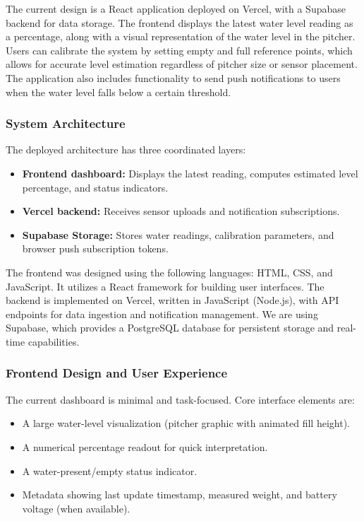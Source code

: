 The current design is a React application deployed on Vercel, with a Supabase backend for data storage. The frontend displays the latest water level reading as a percentage, 
along with a visual representation of the water level in the pitcher. Users can calibrate the system by setting empty and full reference points, which allows for accurate 
level estimation regardless of pitcher size or sensor placement. The application also includes functionality to send push notifications to users when the water level falls 
below a certain threshold.

\subsubsection{System Architecture}
The deployed architecture has three coordinated layers:

\begin{itemize}
	\item \textbf{Frontend dashboard:} Displays the latest reading, computes estimated level percentage, and status indicators.
    \item \textbf{Vercel backend:} Receives sensor uploads and notification subscriptions.
	\item \textbf{Supabase Storage:} Stores water readings, calibration parameters, and browser push subscription tokens.
\end{itemize}

\noindent The frontend was designed using the following languages: HTML, CSS, and JavaScript. It utilizes a React framework for building user interfaces. The backend is 
implemented on Vercel, written in JavaScript (Node.js), with API endpoints for data ingestion and notification management. We are using Supabase, which provides a 
PostgreSQL database for persistent storage and real-time capabilities.

\subsubsection{Frontend Design and User Experience}
The current dashboard is minimal and task-focused. Core interface elements are:

\begin{itemize}
	\item A large water-level visualization (pitcher graphic with animated fill height).
	\item A numerical percentage readout for quick interpretation.
	\item A water-present/empty status indicator.
	\item Metadata showing last update timestamp, measured weight, and battery voltage (when available).
\end{itemize}

